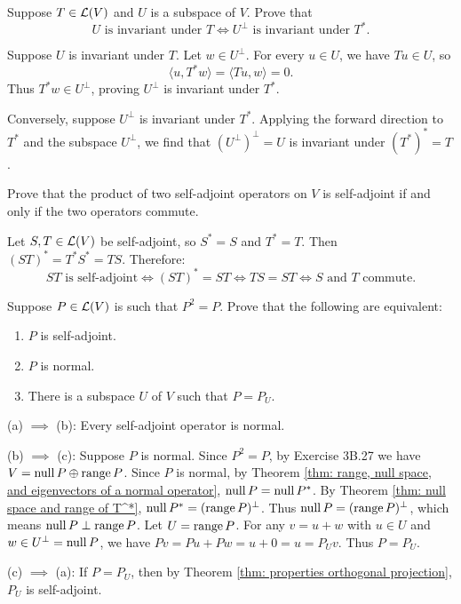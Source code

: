 \begin{xrcs}
  Suppose $T \in \mathcal{L}(V)$ and $U$ is a subspace of $V$. Prove that
  \begin{equation}
    U \text{ is invariant under } T \iff U^\perp \text{ is invariant under } T^*.
  \end{equation}

\begin{xprf}
  \Rightarrowdirection Suppose $U$ is invariant under $T$. Let $w \in U^\perp$. For every $u \in U$, we have $Tu \in U$, so
  \[
    \langle u, T^*w \rangle = \langle Tu, w \rangle = 0.
  \]
  Thus $T^*w \in U^\perp$, proving $U^\perp$ is invariant under $T^*$.

  \Leftarrowdirection Conversely, suppose $U^\perp$ is invariant under $T^*$. Applying the forward direction to $T^*$ and the subspace $U^\perp$, we find that $(U^\perp)^\perp = U$ is invariant under $(T^*)^* = T$.
\end{xprf}
\end{xrcs}

\begin{xrcs}
  Prove that the product of two self-adjoint operators on $V$ is self-adjoint if and only if the two operators commute.

\begin{xprf}
  Let $S, T \in \mathcal{L}(V)$ be self-adjoint, so $S^* = S$ and $T^* = T$.
  Then $(ST)^* = T^*S^* = TS$.
  Therefore:
  \[
    ST \text{ is self-adjoint} \iff (ST)^* = ST \iff TS = ST \iff S \text{ and } T \text{ commute}.
  \]
\end{xprf}
\end{xrcs}

\begin{xrcs}
  Suppose $P \in \mathcal{L}(V)$ is such that $P^2 = P$. Prove that the following are equivalent:
  \begin{enumerate}[label=\textbf{(\alph*)}]
    \item $P$ is self-adjoint.
    \item $P$ is normal.
    \item There is a subspace $U$ of $V$ such that $P = P_U$.
  \end{enumerate}

\begin{xprf}
  (a) $\implies$ (b): Every self-adjoint operator is normal.

  (b) $\implies$ (c): Suppose $P$ is normal. Since $P^2 = P$, by Exercise 3B.27 we have $V = \operatorname{null} P \oplus \operatorname{range} P$.
  Since $P$ is normal, by Theorem \ref{thm: range, null space, and eigenvectors of a normal operator}, $\operatorname{null} P = \operatorname{null} P^*$.
  By Theorem \ref{thm: null space and range of T^*}, $\operatorname{null} P^* = (\operatorname{range} P)^\perp$.
  Thus $\operatorname{null} P = (\operatorname{range} P)^\perp$, which means $\operatorname{null} P \perp \operatorname{range} P$.
  Let $U = \operatorname{range} P$. For any $v = u + w$ with $u \in U$ and $w \in U^\perp = \operatorname{null} P$, we have $Pv = Pu + Pw = u + 0 = u = P_U v$. Thus $P = P_U$.

  (c) $\implies$ (a): If $P = P_U$, then by Theorem \ref{thm: properties orthogonal projection}, $P_U$ is self-adjoint.
\end{xprf}
\end{xrcs}

